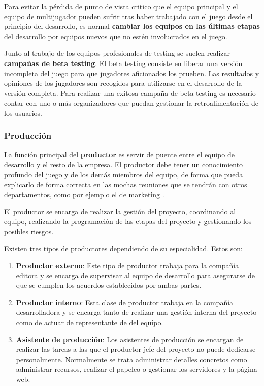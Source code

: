 Para evitar la pérdida de punto de vista critico que el equipo principal y el equipo de multijugador pueden sufrir tras haber trabajado con el juego desde el principio del desarrollo, es normal \textbf{cambiar los equipos en las últimas etapas} del desarrollo por equipos nuevos que no estén involucrados en el juego.

Junto al trabajo de los equipos profesionales de testing se suelen realizar \textbf{campañas de beta testing}. El beta testing consiste en liberar una versión incompleta del juego para que jugadores aficionados los prueben. Las resultados y opiniones de los jugadores son recogidos para utilizarse en el desarrollo de la versión completa. Para realizar una exitosa campaña de beta testing es necesario contar con uno o más organizadores que puedan gestionar la retroalimentación de los usuarios.

\subsubsection{Producción}
La función principal del \textbf{productor} es servir de puente entre el equipo de desarrollo y el resto de la empresa. El productor debe tener un conocimiento profundo del juego y de los demás miembros del equipo, de forma que pueda explicarlo de forma correcta en las mochas reuniones que se tendrán con otros departamentos, como por ejemplo el de marketing \cite{game_design_2}.

El productor se encarga de realizar la gestión del proyecto, coordinando al equipo, realizando la programación de las etapas del proyecto y gestionando los posibles riesgos.

Existen tres tipos de productores dependiendo de su especialidad. Estos son:
\begin{enumerate}
\item \textbf{Productor externo}: Este tipo de productor trabaja para la compañía editora y se encarga de supervisar al equipo de desarrollo para asegurarse de que se cumplen los acuerdos establecidos por ambas partes.
\item \textbf{Productor interno}: Esta clase de productor trabaja en la compañía desarrolladora y se encarga tanto de realizar una gestión interna del proyecto como de actuar de representante de del equipo.
\item \textbf{Asistente de producción}: Los asistentes de producción se encargan de realizar las tareas a las que el productor jefe del proyecto no puede dedicarse personalmente. Normalmente se trata administrar detalles concretos como administrar recursos, realizar el papeleo o gestionar los servidores y la página web.
\end{enumerate}

